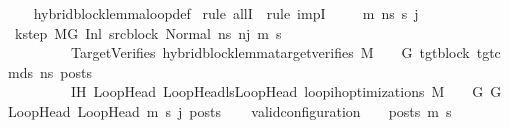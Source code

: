 \begin{isabellebody}
%
\isadelimproof
\ \ %
\endisadelimproof
%
\isatagproof
{}\isamarkupfalse%
\ hybrid{\isacharunderscore}{\kern0pt}block{\isacharunderscore}{\kern0pt}lemma{\isacharunderscore}{\kern0pt}loop{\isacharunderscore}{\kern0pt}def\isanewline
{}\isamarkupfalse%
\ {\isacharparenleft}{\kern0pt}rule\ allI\ {\isacharbar}{\kern0pt}\ rule\ impI{\isacharparenright}{\kern0pt}{\isacharplus}{\kern0pt}\ %
\isanewline
\ \ \isamarkupfalse%
\ m{\isacharprime}{\kern0pt}\ ns\ s{\isacharprime}{\kern0pt}\ j\isanewline
\ \ \isamarkupfalse%
\ k{\isacharunderscore}{\kern0pt}step{\isacharcolon}{\kern0pt}\ {\isachardoublequoteopen}M{\isacharcomma}{\kern0pt}{\isasymLambda}{\isacharcomma}{\kern0pt}{\isasymGamma}{\isacharcomma}{\kern0pt}{\isasymOmega}{\isacharcomma}{\kern0pt}G\ {\isasymturnstile}{\isacharparenleft}{\kern0pt}Inl\ src{\isacharunderscore}{\kern0pt}block{\isacharunderscore}{\kern0pt}{}{\isacharcomma}{\kern0pt}\ Normal\ ns{\isacharparenright}{\kern0pt}\ {\isacharminus}{\kern0pt}n{\isasymrightarrow}{\isacharcircum}{\kern0pt}j\ {\isacharparenleft}{\kern0pt}m{\isacharprime}{\kern0pt}{\isacharcomma}{\kern0pt}\ s{\isacharprime}{\kern0pt}{\isacharparenright}{\kern0pt}{\isachardoublequoteclose}\ \isanewline
\ \ \ \ \ \ \ \ \ TargetVerifies{\isacharcolon}{\kern0pt}\ {\isachardoublequoteopen}hybrid{\isacharunderscore}{\kern0pt}block{\isacharunderscore}{\kern0pt}lemma{\isacharunderscore}{\kern0pt}target{\isacharunderscore}{\kern0pt}verifies\ M\ {\isasymLambda}\ {\isasymGamma}\ {\isasymOmega}\ G{\isacharprime}{\kern0pt}\ tgt{\isacharunderscore}{\kern0pt}block\ tgt{\isacharunderscore}{\kern0pt}cmds{\isacharunderscore}{\kern0pt}{}\ ns\ posts{\isachardoublequoteclose}\ \ \isanewline
\ \ \ \ \ \ \ \ \ IH{\isacharcolon}{\kern0pt}\ {\isachardoublequoteopen}{\isasymforall}{\isacharparenleft}{\kern0pt}LoopHead{\isacharcomma}{\kern0pt}\ LoopHead{\isacharprime}{\kern0pt}{\isacharparenright}{\kern0pt}{\isasymin}lsLoopHead{\isachardot}{\kern0pt}\ loop{\isacharunderscore}{\kern0pt}ih{\isacharunderscore}{\kern0pt}optimizations\ M\ {\isasymLambda}\ {\isasymGamma}\ {\isasymOmega}\ G\ G{\isacharprime}{\kern0pt}\ LoopHead\ LoopHead{\isacharprime}{\kern0pt}\ m{\isacharprime}{\kern0pt}\ s{\isacharprime}{\kern0pt}\ j\ posts{\isachardoublequoteclose}\isanewline
\ \ \isamarkupfalse%
\ {\isachardoublequoteopen}valid{\isacharunderscore}{\kern0pt}configuration\ {\isasymLambda}\ {\isasymGamma}\ {\isasymOmega}\ posts\ m{\isacharprime}{\kern0pt}\ s{\isacharprime}{\kern0pt}{\isachardoublequoteclose}\isanewline

\end{isabellebody}
